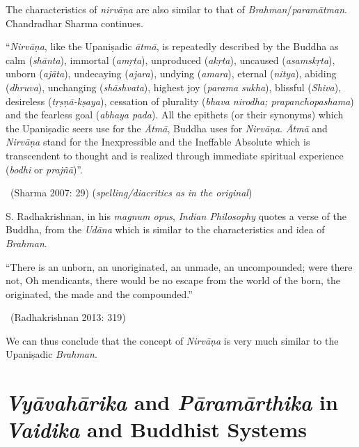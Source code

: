 The characteristics of \textit{nirvāṇa} are also similar to that of \textit{Brahman}/\textit{para\-mātman}. Chandradhar Sharma continues.

\begin{myquote}
“\textit{Nirvāṇa}, like the Upaniṣadic \textit{ātmā}, is repeatedly described by the Buddha as calm (\textit{shānta}), immortal (\textit{amṛta}), unproduced (\textit{akṛta}), uncaused (\textit{asamskṛta}), unborn (\textit{ajāta}), undecaying (\textit{ajara}), undying (\textit{amara}), eternal (\textit{nitya}), abiding (\textit{dhruva}), unchanging (\textit{shāshvata}), highest joy (\textit{parama sukha}), blissful (\textit{Shiva}), desireless (\textit{tṛṣṇā-kṣaya}), cessation of plurality (\textit{bhava nirodha; prapanchopashama}) and the fearless goal (\textit{abhaya pada}). All the epithets (or their synonyms) which the Upaniṣadic seers use for the \textit{Ātmā}, Buddha uses for \textit{Nirvāṇa}. \textit{Ātmā} and \textit{Nirvāṇa} stand for the Inexpressible and the Ineffable Absolute which is transcendent to thought and is realized through immediate spiritual experience (\textit{bodhi} or \textit{prajñā})”. 

~\hfill (Sharma 2007: 29) (\textit{spelling/diacritics as in the original})
\end{myquote}

S. Radhakrishnan, in his \textit{magnum opus}, \textit{Indian Philosophy} quotes a verse of the Buddha, from the \textit{Udāna} which is similar to the characteristics and idea of \textit{Brahman}.

\begin{myquote}
“There is an unborn, an unoriginated, an unmade, an uncompounded; were there not, Oh mendicants, there would be no escape from the world of the born, the originated, the made and the compounded.” 

~\hfill (Radhakrishnan 2013: 319)
\end{myquote}

We can thus conclude that the concept of \textit{Nirvāṇa} is very much similar to the Upaniṣadic \textit{Brahman}.

\vspace{-.3cm}

\section*{\textit{Vyāvahārika} and \textit{Pāramārthika} \hfill\break in \textit{Vaidika} and Buddhist Systems}

